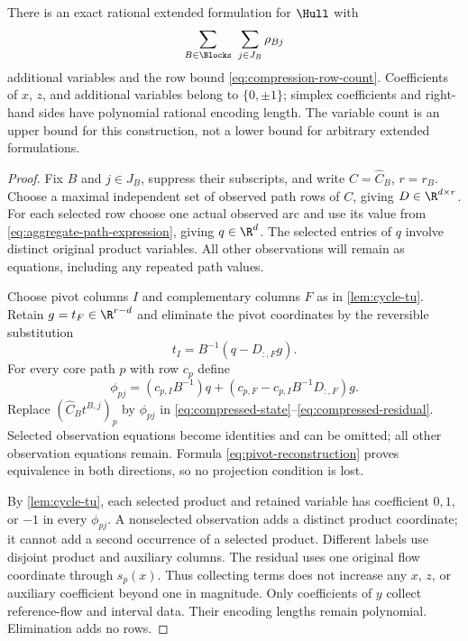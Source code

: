 \begin{theorem}\label{thm:observed-compression}
There is an exact rational extended formulation for $\Hull$ with
\begin{equation}\label{eq:observed-variable-count}
 \sum_{B\in\Blocks}\ \sum_{j\in J_B}\rho_{Bj}
\end{equation}
additional variables and the row bound \eqref{eq:compression-row-count}.
Coefficients of $x$, $z$, and additional variables belong to $\{0,\pm1\}$;
simplex coefficients and right-hand sides have polynomial rational encoding
length. The variable count is an upper bound for this construction, not a
lower bound for arbitrary extended formulations.
\end{theorem}
\begin{proof}
Fix $B$ and $j\in J_B$, suppress their subscripts, and write
$C=\widehat C_B$, $r=r_B$. Choose a maximal independent set of observed
path rows of $C$, giving $D\in\R^{d\times r}$. For each selected row
choose one actual observed arc and use its value from
\eqref{eq:aggregate-path-expression}, giving $q\in\R^d$. The selected
entries of $q$ involve distinct original product variables. All other
observations will remain as equations, including any repeated path values.

Choose pivot columns $I$ and complementary columns $F$ as in
\cref{lem:cycle-tu}. Retain $g=t_F\in\R^{r-d}$ and eliminate the pivot
coordinates by the reversible substitution
\begin{equation}\label{eq:pivot-reconstruction}
 t_I=B^{-1}(q-D_{:,F}g).
\end{equation}
For every core path $p$ with row $c_p$ define
\begin{equation}\label{eq:path-reconstruction}
 \phi_{pj}=(c_{p,I}B^{-1})q+
            (c_{p,F}-c_{p,I}B^{-1}D_{:,F})g.
\end{equation}
Replace $(\widehat C_Bt^{B,j})_p$ by $\phi_{pj}$ in
\eqref{eq:compressed-state}--\eqref{eq:compressed-residual}. Selected
observation equations become identities and can be omitted; all other
observation equations remain. Formula \eqref{eq:pivot-reconstruction}
proves equivalence in both directions, so no projection condition is lost.

By \cref{lem:cycle-tu}, each selected product and retained variable has
coefficient $0,1$, or $-1$ in every $\phi_{pj}$. A nonselected observation
adds a distinct product coordinate; it cannot add a second occurrence of
a selected product. Different labels use disjoint product and auxiliary
columns. The residual uses one original flow coordinate through $s_p(x)$.
Thus collecting terms does not increase any $x$, $z$, or auxiliary
coefficient beyond one in magnitude. Only coefficients of $y$ collect
reference-flow and interval data. Their encoding lengths remain polynomial.
Elimination adds no rows.


\end{proof}
